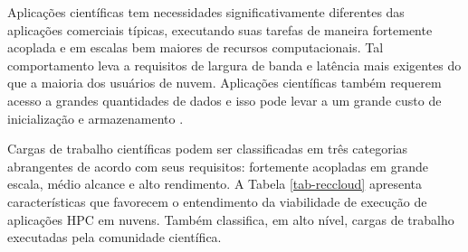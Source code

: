 \documentclass[tese,capa]{texufpel}
\begin{document}
Aplicações científicas tem necessidades significativamente diferentes das aplicações comerciais típicas, executando suas tarefas de maneira fortemente acoplada e em escalas bem maiores de recursos computacionais. Tal comportamento leva a requisitos de largura de banda e latência mais exigentes do que a maioria dos usuários de nuvem. Aplicações científicas também requerem acesso a grandes quantidades de dados e isso pode levar a um grande custo de inicialização e armazenamento \cite{magellan_report_2011}.

Cargas de trabalho científicas podem ser classificadas em três categorias abrangentes de acordo com seus requisitos: fortemente acopladas em grande escala, médio alcance e alto rendimento. A Tabela \ref{tab-reccloud} apresenta características que favorecem o entendimento da viabilidade de execução de aplicações HPC em nuvens. Também classifica, em alto nível, cargas de trabalho executadas pela comunidade científica.
\end{document}
